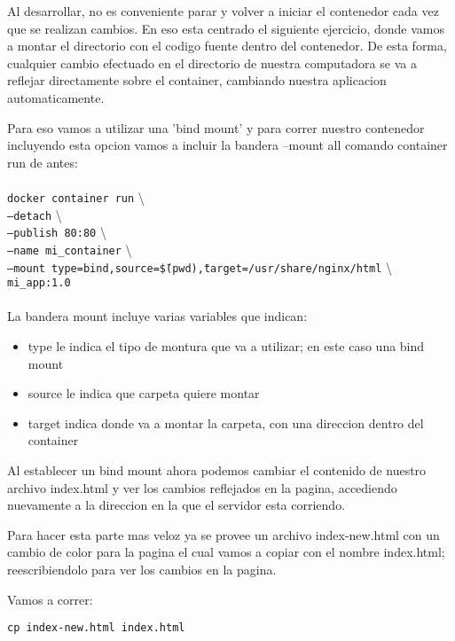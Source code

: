 \documentclass[11pt]{article} %
\begin{document}
Al desarrollar, no es conveniente parar y volver a iniciar el contenedor cada vez que se realizan cambios. En eso esta centrado el siguiente ejercicio, donde vamos a montar el directorio con el codigo fuente dentro del contenedor. De esta forma, cualquier cambio efectuado en el directorio de nuestra computadora se va a reflejar directamente sobre el container, cambiando nuestra aplicacion automaticamente.

Para eso vamos a utilizar una 'bind mount' y para correr nuestro contenedor incluyendo esta opcion vamos a incluir la bandera --mount all comando container run de antes: \\ \\
	\texttt{docker container run} \textbackslash \\
	\texttt{--detach} \textbackslash \\
	\texttt{--publish 80:80} \textbackslash \\
	\texttt{--name mi\_container} \textbackslash \\
	\texttt{--mount type=bind,source=\"\$(pwd)\",target=/usr/share/nginx/html} \textbackslash \\
	\texttt{mi\_app:1.0} \\ \\

La bandera mount incluye varias variables que indican:
\begin{itemize}
	
	\item
	type le indica el tipo de montura que va a utilizar; en este caso una bind mount

	\item	
	source le indica que carpeta quiere montar
	
	\item	
	target indica donde va a montar la carpeta, con una direccion dentro del container
\end{itemize}

Al establecer un bind mount ahora podemos cambiar el contenido de nuestro archivo index.html y ver los cambios reflejados en la pagina, accediendo nuevamente a la direccion en la que el servidor esta corriendo.

Para hacer esta parte mas veloz ya se provee un archivo index-new.html con un cambio de color para la pagina el cual vamos a copiar con el nombre index.html; reescribiendolo para ver los cambios en la pagina.

Vamos a correr:
\begin{center}
	\texttt{cp index-new.html index.html}
\end{center}
\end{document}
